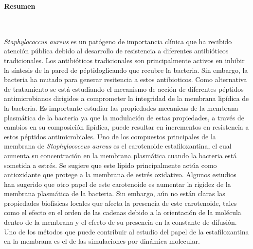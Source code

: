 \newpage
\textbf{\LARGE Resumen}
\\\\
\textit{Staphylococcus aureus} es un pat\'{o}geno de importancia cl\'{i}nica que ha recibido atenci\'{o}n p\'{u}blica debido al desarrollo de resistencia a diferentes antibi\'{o}ticos tradicionales. Los antibi\'{o}ticos tradicionales son principalmente activos en inhibir la s\'{i}ntesis de la pared de p\'{e}ptidoglicando que recubre la bacteria. Sin embargo, la bacteria ha mutado para generar resitencia a estos antibioticos. Como alternativa de tratamiento se est\'{a} estudiando el mecanismo de acci\'{o}n de diferentes p\'{e}ptidos antimicrobianos dirigidos a comprometer la integridad de la membrana lip\'{i}dica de la bacteria. Es importante estudiar las propiedades mecanicas de la membrana plasm\'{a}tica de la bacteria ya que la modulaci\'{o}n de estas propiedades, a trav\'{e}s de cambios en su composici\'{o}n lip\'{i}dica, puede resultar en incrementos en resistencia a estos p\'{e}ptidos antimicrobiales. Uno de los compuestos principales de la membrana de \textit{Staphylococcus aureus} es  el carotenoide estafiloxantina, el cual aumenta  su concentraci\'{o}n en la membrana plasm\'{a}tica cuando la bacteria est\'{a} sometida a estr\'{e}s. Se sugiere que este l\'{i}pido principalmente act\'{u}a como antioxidante que protege a la membrana de estr\'{e}s oxidativo. Algunos estudios han sugerido que otro papel de este carotenoide es aumentar la rigidez de la membrana plasm\'{a}tica de la bacteria. Sin embargo, a\'{u}n no est\'{a}n claras las propiedades biof\'{i}sicas locales que afecta la presencia de este carotenoide, tales como el efecto en el orden de las cadenas debido a la orientaci\'{o}n de la mol\'{e}cula dentro de la membrana y el efecto de su presencia en la constante de difusi\'{o}n. Uno de los m\'{e}todos que puede contribuir al estudio del papel de la estafiloxantina en la membrana es el de las simulaciones por din\'{a}mica molecular.\\
